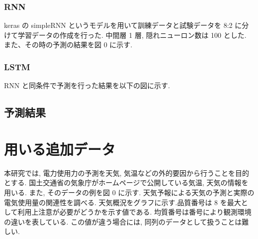 \subsubsection{RNN}
keras の simpleRNN というモデルを用いて訓練データと試験データを 8:2 に分けて学習データの作成を行った. 中間層 1 層, 隠れニューロン数は 100 とした. また、その時の予測の結果を図 0 に示す.



\subsubsection{LSTM}
RNN と同条件で予測を行った結果を以下の図に示す.



\subsection{予測結果}

\section{用いる追加データ}
本研究では, 電力使用力の予測を天気, 気温などの外的要因から行うことを目的とする.
国土交通省の気象庁がホームページで公開している気温, 天気の情報を用いる.
また, そのデータの例を図 0 に示す. 天気予報による天気の予測と実際の電気使用量の関連性を調べる. 天気概況をグラフに示す.品質番号は 8 を最大として利用上注意が必要がどうかを示す値である. 均質番号は番号により観測環境の違いを表している. この値が違う場合には, 同列のデータとして扱うことは難しい. 

